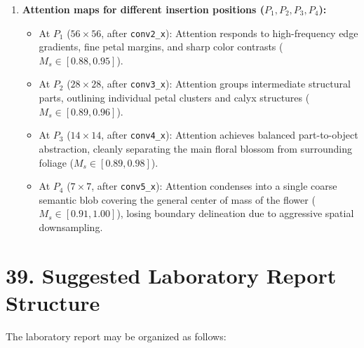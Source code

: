 \documentclass[10pt]{article}
\begin{document}
\begin{enumerate}
\item \textbf{Attention maps for different insertion positions ($P_1, P_2, P_3, P_4$):}
\begin{itemize}
\item At $P_1$ ($56\times56$, after \texttt{conv2\_x}): Attention responds to high-frequency edge gradients, fine petal margins, and sharp color contrasts ($M_s \in [0.88, 0.95]$).
\item At $P_2$ ($28\times28$, after \texttt{conv3\_x}): Attention groups intermediate structural parts, outlining individual petal clusters and calyx structures ($M_s \in [0.89, 0.96]$).
\item At $P_3$ ($14\times14$, after \texttt{conv4\_x}): Attention achieves balanced part-to-object abstraction, cleanly separating the main floral blossom from surrounding foliage ($M_s \in [0.89, 0.98]$).
\item At $P_4$ ($7\times7$, after \texttt{conv5\_x}): Attention condenses into a single coarse semantic blob covering the general center of mass of the flower ($M_s \in [0.91, 1.00]$), losing boundary delineation due to aggressive spatial downsampling.
\end{itemize}

\end{enumerate}

\section*{39. Suggested Laboratory Report Structure}

The laboratory report may be organized as follows:
\end{document}
